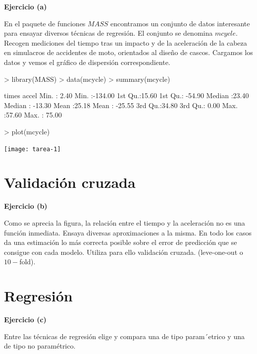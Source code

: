 \documentclass[a4paper,12pt]{article}
\newenvironment{exercise}[1]%
{%
  \par\vspace{\baselineskip}\noindent
  \textbf{Ejercicio (#1)}\begin{itshape}%
  \par\vspace{\baselineskip}\noindent\ignorespaces
}%
{%
  \end{itshape}\ignorespacesafterend
}
\begin{document}
\begin{exercise}{a}

En el paquete de funciones $MASS$ encontramos un conjunto de datos interesante
para ensayar diversos t\'ecnicas de regresi\'on. El conjunto se denomina
$mcycle$. Recogen mediciones del tiempo tras un impacto y de la aceleraci\'on
de la cabeza en simulacros de accidentes de moto, orientados al dise\~no de
cascos. Cargamos los datos y vemos el gr\'afico de dispersi\'on correspondiente.

\end{exercise}

\begin{Schunk}
\begin{Sinput}
> library(MASS)
> data(mcycle)
> summary(mcycle)
\end{Sinput}
\begin{Soutput}
     times           accel        
 Min.   : 2.40   Min.   :-134.00  
 1st Qu.:15.60   1st Qu.: -54.90  
 Median :23.40   Median : -13.30  
 Mean   :25.18   Mean   : -25.55  
 3rd Qu.:34.80   3rd Qu.:   0.00  
 Max.   :57.60   Max.   :  75.00  
\end{Soutput}
\begin{Sinput}
> plot(mcycle)
\end{Sinput}
\end{Schunk}
\texttt{[image: tarea-1]}


\section{Validaci\'on cruzada}

\begin{exercise}{b}
Como se aprecia la figura, la relaci\'on entre el tiempo y la aceleraci\'on
no es una funci\'on inmediata. Ensaya diversas aproximaciones a la misma.
En todo los casos da una estimaci\'on lo m\'as correcta posible sobre el error de
predicci\'on que se consigue con cada modelo. Utiliza para ello validaci\'on cruzada. (leve-one-out o $10-$fold).
\end{exercise}

\pagebreak

\section{Regresi\'on}

\begin{exercise}{c}
Entre las t\'ecnicas de regresi\'on elige y compara
una de tipo param´etrico y una de tipo no param\'etrico.
\end{exercise}
\end{document}
